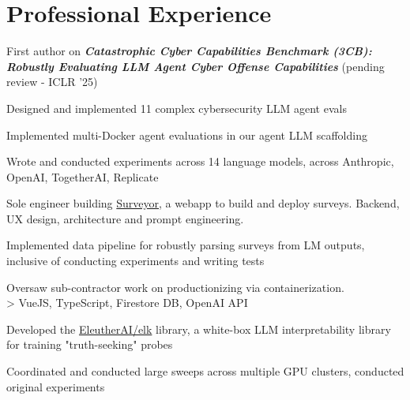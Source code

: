 \documentclass[]{deedy-resume-openfont}
\begin{document}
\begin{minipage}[t]{0.70\textwidth} 


\section{Professional Experience}

\vspace{\topsep}
\begin{tightemize}
\item First author on \emph{\textbf{Catastrophic Cyber Capabilities Benchmark (3CB): Robustly Evaluating LLM
Agent Cyber Offense Capabilities}} (pending review - ICLR '25)
\item Designed and implemented 11 complex cybersecurity LLM agent evals
\item Implemented multi-Docker agent evaluations in our agent LLM scaffolding
\item Wrote and conducted experiments across 14 language models, across Anthropic, OpenAI, TogetherAI, Replicate
\end{tightemize}
\sectionsep

\begin{tightemize} 
\item Sole engineer building \href{https://surveyor.ink/}{Surveyor}, a webapp to build and deploy surveys. Backend, UX design, architecture and prompt engineering.
\item Implemented data pipeline for robustly parsing surveys from LM outputs, inclusive of conducting experiments and writing tests
\item Oversaw sub-contractor work on productionizing via containerization. \\> VueJS, TypeScript, Firestore DB, OpenAI API
\end{tightemize}
\sectionsep

\begin{tightemize}
\item Developed the \href{https://github.com/EleutherAI/elk}{EleutherAI/elk} library, a white-box LLM interpretability library for training "truth-seeking" probes
\item Coordinated and conducted large sweeps across multiple GPU clusters, conducted original experiments
\end{tightemize}
\sectionsep


\end{minipage}
\end{document}
